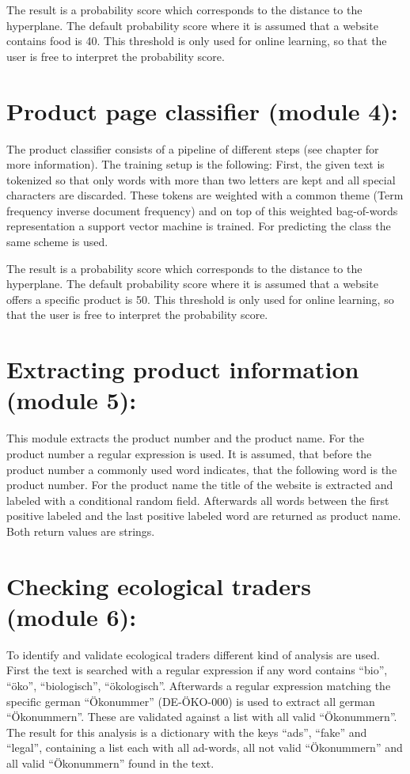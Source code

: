 \documentclass[letterpaper,10pt,english]{sphinxmanual}
\begin{document}
The result is a probability score which corresponds to the distance to
the hyperplane. The default probability score where it is assumed that
a website contains food is 40. This threshold is only used for online
learning, so that the user is free to interpret the probability score.


\section{Product page classifier (module 4):}
\label{\detokenize{modules:product-page-classifier-module-4}}
The product classifier consists of a pipeline of different steps (see
chapter {\hyperref[\detokenize{training:training-clf}]{}} for more information). The training setup
is the following: First, the given text is tokenized so that only
words with more than two letters are kept and all special characters
are discarded. These tokens are weighted with a common theme (Term
frequency inverse document frequency) and on top of this weighted
bag-of-words representation a support vector machine is trained. For
predicting the class the same scheme is used.

The result is a probability score which corresponds to the distance to
the hyperplane. The default probability score where it is assumed that
a website offers a specific product is 50. This threshold is only used
for online learning, so that the user is free to interpret the
probability score.


\section{Extracting product information (module 5):}
\label{\detokenize{modules:extracting-product-information-module-5}}
This module extracts the product number and the product name. For the
product number a regular expression is used. It is assumed, that
before the product number a commonly used word indicates, that the
following word is the product number. For the product name the title
of the website is extracted and labeled with a conditional random
field. Afterwards all words between the first positive labeled and the
last positive labeled word are returned as product name. Both return
values are strings.


\section{Checking ecological traders (module 6):}
\label{\detokenize{modules:checking-ecological-traders-module-6}}
To identify and validate ecological traders different kind of analysis
are used. First the text is searched with a regular expression if any
word contains “bio”, “öko”, “biologisch”, “ökologisch”. Afterwards a
regular expression matching the specific german “Ökonummer”
(DE-ÖKO-000) is used to extract all german “Ökonummern”. These are
validated against a list with all valid “Ökonummern”. The result for
this analysis is a dictionary with the keys “ads”, “fake” and “legal”,
containing a list each with all ad-words, all not valid “Ökonummern”
and all valid “Ökonummern” found in the text.
\end{document}
